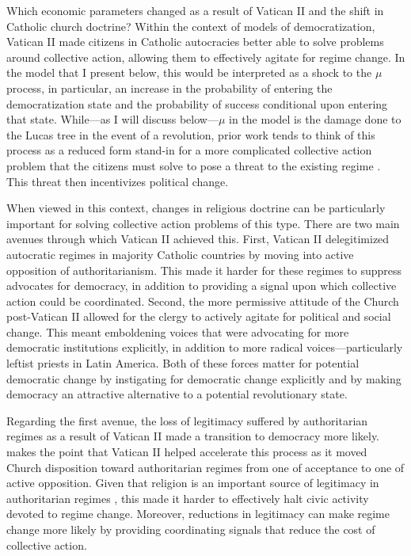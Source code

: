 \label{par:model_link_beg}
Which economic parameters changed as a result of Vatican II and the shift in Catholic church doctrine? Within the context of models of democratization, Vatican II made citizens in Catholic autocracies better able to solve problems around collective action, allowing them to effectively agitate for regime change. In the model that I present below, this would be interpreted as a shock to the $\mu$ process, in particular, an increase in the probability of entering the democratization state and the probability of success conditional upon entering that state. While---as I will discuss below---$\mu$ in the model is the damage done to the Lucas tree in the event of a revolution, prior work tends to think of this process as a reduced form stand-in for a more complicated collective action problem that the citizens must solve to pose a threat to the existing regime \citep{Boix2003,Acemoglu2006}. This threat then incentivizes political change.

When viewed in this context, changes in religious doctrine can be particularly important for solving collective action problems of this type.  There are two main avenues through which Vatican II achieved this. First, Vatican II delegitimized autocratic regimes in majority Catholic countries by moving into active opposition of authoritarianism.  This made it harder for these regimes to suppress advocates for democracy, in addition to providing a signal upon which collective action could be coordinated. Second, the more permissive attitude of the Church post-Vatican II allowed for the clergy to actively agitate for political and social change. This meant emboldening voices that were advocating for more democratic institutions explicitly, in addition to more radical voices---particularly leftist priests in Latin America. Both of these forces matter for potential democratic change by instigating for democratic change explicitly and by making democracy an attractive alternative to a potential revolutionary state.
\label{par:model_link_end}

\label{par:legit_beg}
Regarding the first avenue, the loss of legitimacy suffered by authoritarian regimes as a result of Vatican II made a transition to democracy more likely. \cite{Huntington1991} makes the point that Vatican II helped accelerate this process as it moved Church disposition toward authoritarian regimes from one of acceptance to one of active opposition. Given that religion is an important source of legitimacy in authoritarian regimes \citep{Weber1921,Billings1994}, this made it harder to effectively halt civic activity devoted to regime change. Moreover, reductions in legitimacy can make regime change more likely by providing coordinating signals that reduce the cost of collective action.

